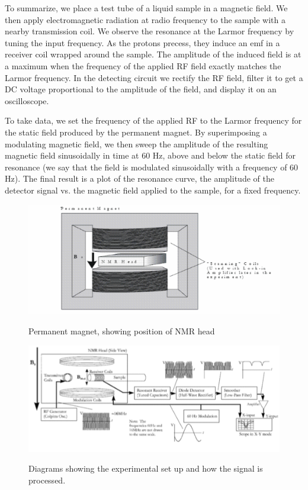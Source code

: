 \documentclass{../lab}
\begin{document}
To summarize, we place a test tube of a liquid sample in a magnetic field. We then apply electromagnetic radiation at radio frequency to the sample with a nearby transmission coil. We observe the resonance at the Larmor frequency by tuning the input frequency. As the protons precess, they induce an emf in a receiver coil wrapped around the sample. The amplitude of the induced field is at a maximum when the frequency of the applied RF field exactly matches the Larmor frequency. In the detecting circuit we rectify the RF field, filter it to get a DC voltage proportional to the amplitude of the field, and display it on an oscilloscope.

To take data, we set the frequency of the applied RF to the Larmor frequency for the static field produced by the permanent magnet. By superimposing a modulating magnetic field, we then sweep the amplitude of the resulting magnetic field sinusoidally in time at 60 Hz, above and below the static field for resonance (we say that the field is modulated sinusoidally with a frequency of 60 Hz). The final result is a plot of the resonance curve, the amplitude of the detector signal vs. the magnetic field applied to the sample, for a fixed frequency.

\begin{figure}[h]
    \centering
    \href{http://experimentationlab.berkeley.edu/sites/default/files/Permanentmagnet.png}
    {\includegraphics[width=0.5\linewidth]{images/PermanentMagnet.png}}
    \caption{Permanent magnet, showing position of NMR head}
    \label{fig:700px-NMR9}
\end{figure}

\begin{figure}[h]
    \centering
    \href{http://experimentationlab.berkeley.edu/sites/default/files/Blockdiagram.gif}{\includegraphics[width=0.5\linewidth]{images/BlockDiagram.png}}
    \caption{Diagrams showing the experimental set up and how the signal is processed.}
    \label{fig:500px-NMR10}
\end{figure}
\end{document}
